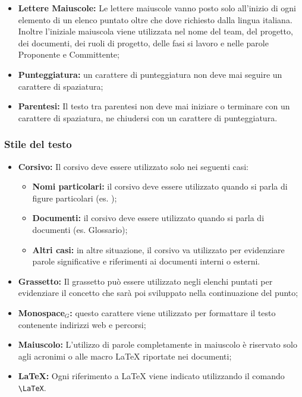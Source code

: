 \begin{itemize}
\item \textbf{Lettere Maiuscole:} Le lettere maiuscole vanno posto solo  all'inizio di ogni elemento di un elenco puntato oltre che dove richiesto dalla lingua italiana. Inoltre l'iniziale maiuscola viene utilizzata nel nome del team, del progetto, dei documenti, dei ruoli di progetto, delle fasi si lavoro e nelle parole Proponente e Committente;
\item \textbf{Punteggiatura:} un carattere di punteggiatura non deve mai seguire un carattere di spaziatura;
\item \textbf{Parentesi:} Il testo tra parentesi non deve mai iniziare o terminare con un carattere di spaziatura, ne chiudersi con un carattere di punteggiatura.
\end{itemize}

\subsubsection{Stile del testo}

\begin{itemize}
\item \textbf{Corsivo:} Il corsivo deve essere utilizzato solo nei seguenti casi:
\begin{itemize}
\item \textbf{Nomi particolari:} il corsivo deve essere utilizzato quando si parla di figure particolari (es. \ruoloResponsabile);
\item \textbf{Documenti:} il corsivo deve essere utilizzato quando si parla di documenti (es. Glossario);
\item \textbf{Altri casi:} in altre situazione, il corsivo va utilizzato per evidenziare parole significative e riferimenti ai documenti interni o esterni.
\end{itemize} 
\item \textbf{Grassetto:} Il grassetto può essere utilizzato negli elenchi puntati per evidenziare il concetto che sarà poi sviluppato nella continuazione del punto;
\item \textbf{Monospace$_G$:} questo carattere viene utilizzato per formattare il testo contenente indirizzi web e percorsi;
\item \textbf{Maiuscolo:} L'utilizzo di parole completamente in maiuscolo è riservato solo agli acronimi o alle macro \LaTeX{} riportate nei documenti;
\item \textbf{\LaTeX:} Ogni riferimento a \LaTeX{} viene indicato utilizzando il comando \verb|\LaTeX|.
\end{itemize}

